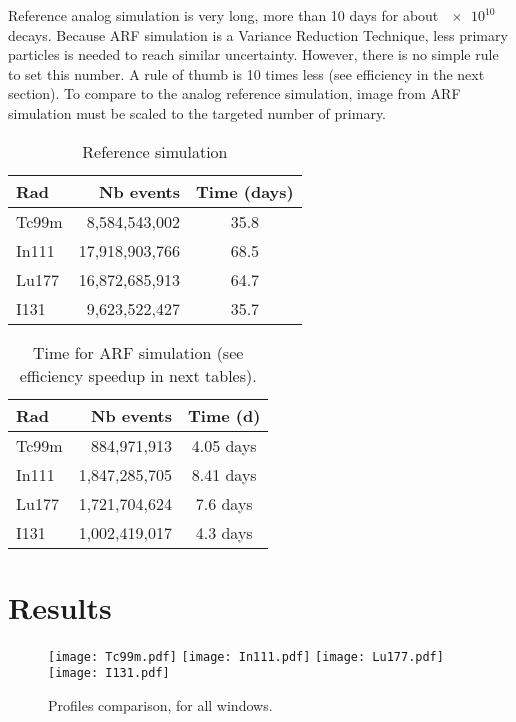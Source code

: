 \documentclass[11pt,final,a4paper]{article}
\begin{document}
Reference analog simulation is very long, more than 10 days for about
$\num{e10}$ decays. Because ARF simulation is a Variance Reduction
Technique, less primary particles is needed to reach similar
uncertainty. However, there is no simple rule to set this number. A
rule of thumb is 10 times less (see efficiency in the next
section). To compare to the analog reference simulation, image from
ARF simulation must be scaled to the targeted number of primary.



\begin{table}[htbp]
  \centering
  \begin{tabular}[htbp]{lrc}
    Rad & Nb events & Time (days) \\\hline
    Tc99m & 8,584,543,002 & 35.8  \\
    In111 & 17,918,903,766 & 68.5  \\
    Lu177 & 16,872,685,913 & 64.7  \\
    I131 & 9,623,522,427 & 35.7  \\    
  \end{tabular}
  \caption{Reference simulation}
  \label{tab:ref_simu}  
\end{table}


\begin{table}[htbp]
  \centering
  \begin{tabular}[htbp]{lrc}
    Rad & Nb events & Time (d) \\\hline
    Tc99m & 884,971,913 &  4.05 days\\
    In111 & 1,847,285,705 & 8.41 days \\
    Lu177 & 1,721,704,624 & 7.6 days \\
    I131 & 1,002,419,017 & 4.3 days
  \end{tabular}
  \caption{Time for ARF simulation (see efficiency speedup in next tables).}
  \label{tab:ref_simu}  
\end{table}


\section{Results}


\begin{figure}[htbp]
  \begin{center}
    \texttt{[image: Tc99m.pdf]}
    \texttt{[image: In111.pdf]}
    \texttt{[image: Lu177.pdf]}
    \texttt{[image: I131.pdf]}
    \caption{Profiles comparison, for all windows.}
    \label{fig:profil}
  \end{center}
\end{figure}
\end{document}

